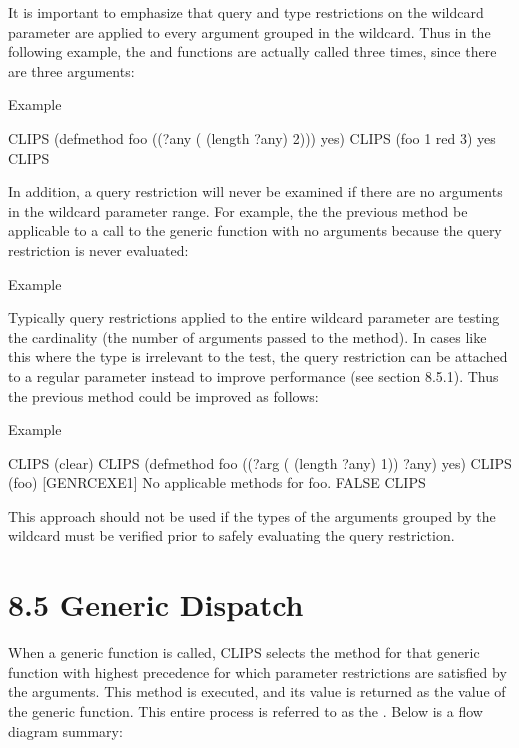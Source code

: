 \documentclass[letterpaper,10pt,english]{sphinxmanual}
\begin{document}
It is important to emphasize that query and type restrictions on the
wildcard parameter are applied to every argument grouped in the
wildcard. Thus in the following example, the \sphinxstylestrong{\textgreater{}} and 
functions are actually called three times, since there are three
arguments:

Example

\begin{sphinxVerbatim}[commandchars=\\\{\}]
CLIPS\PYGZgt{} (defmethod foo ((\PYGZdl{}?any (\PYGZgt{} (length\PYGZdl{} ?any) 2))) yes)
CLIPS\PYGZgt{} (foo 1 red 3)
yes
CLIPS\PYGZgt{}
\end{sphinxVerbatim}

In addition, a query restriction will never be examined if there are no
arguments in the wildcard parameter range. For example, the the previous
method be applicable to a call to the generic function with no
arguments because the query restriction is never evaluated:

Example

\begin{sphinxVerbatim}[commandchars=\\\{\}]
 
\end{sphinxVerbatim}

Typically query restrictions applied to the entire wildcard parameter
are testing the cardinality (the number of arguments passed to the
method). In cases like this where the type is irrelevant to the test,
the query restriction can be attached to a regular parameter instead to
improve performance (see section 8.5.1). Thus the previous method could
be improved as follows:

Example

\begin{sphinxVerbatim}[commandchars=\\\{\}]
CLIPS\PYGZgt{} (clear)
CLIPS\PYGZgt{} (defmethod foo ((?arg (\PYGZgt{} (length\PYGZdl{} ?any) 1)) \PYGZdl{}?any) yes)
CLIPS\PYGZgt{} (foo)
[GENRCEXE1] No applicable methods for foo.
FALSE
CLIPS\PYGZgt{}
\end{sphinxVerbatim}

This approach should not be used if the types of the arguments grouped
by the wildcard must be verified prior to safely evaluating the query
restriction.


\section{8.5 Generic Dispatch}
\label{\detokenize{generic:generic-dispatch}}
When a generic function is called, CLIPS selects the method for that
generic function with highest precedence for which parameter
restrictions are satisfied by the arguments. This method is executed,
and its value is returned as the value of the generic function. This
entire process is referred to as the . Below is a
flow diagram summary:
\end{document}
